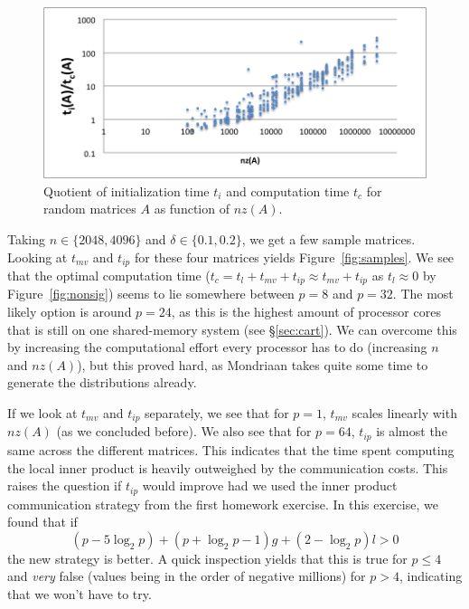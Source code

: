 \documentclass[11pt]{amsart}
\theoremstyle{definition}
\begin{document}
\begin{figure}
  \includegraphics[width=\linewidth]{quotient.png}
  \caption{Quotient of initialization time $t_i$ and computation time $t_c$ for random matrices $A$ as function of $nz(A)$.}
  \label{fig:quotient}
\end{figure}

Taking $n \in \{2048, 4096\}$ and $\delta \in \{0.1, 0.2\}$, we get a few sample matrices. Looking at $t_{mv}$ and $t_{ip}$ for these four matrices yields Figure~\ref{fig:samples}. We see that the optimal computation time ($t_c = t_l + t_{mv} + t_{ip} \approx t_{mv} + t_{ip}$ as $t_l \approx 0$ by Figure~\ref{fig:nonsig}) seems to lie somewhere between $p=8$ and $p=32$. The most likely option is around $p=24$, as this is the highest amount of processor cores that is still on one shared-memory system (see \S \ref{sec:cart}). We can overcome this by increasing the computational effort every processor has to do (increasing $n$ and $nz(A)$), but this proved hard, as Mondriaan takes quite some time to generate the distributions already.

If we look at $t_{mv}$ and $t_{ip}$ separately, we see that for $p=1$, $t_{mv}$ scales linearly with $nz(A)$ (as we concluded before). We also see that for $p=64$, $t_{ip}$ is almost the same across the different matrices. This indicates that the time spent computing the local inner product is heavily outweighed by the communication costs. This raises the question if $t_{ip}$ would improve had we used the inner product communication strategy from the first homework exercise. \cite{TODOHUISWERK} In this exercise, we found that if
\[
  (p - 5\log_2 p) + (p + \log_2 p - 1)g + (2-\log_2 p)l > 0
\]
the new strategy is better. A quick inspection yields that this is true for $p \leq 4$ and \emph{very} false (values being in the order of negative millions) for $p > 4$, indicating that we won't have to try.
\end{document}
